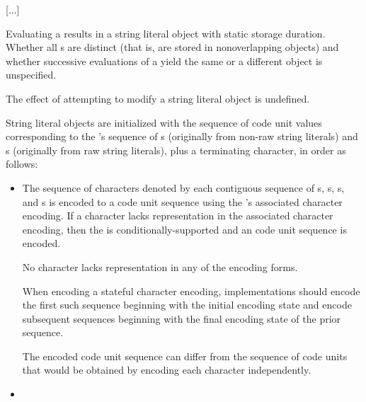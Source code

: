 \documentclass{wg21}
\newcommand{\replaceucs}{\changed{UCS}{Unicode}}
\begin{document}
\textcolor{noteclr}{[...]}


\pnum
Evaluating a  results in a string literal object
with static storage duration.
%
Whether all s are distinct (that is, are stored in
nonoverlapping objects) and whether successive evaluations of a
 yield the same or a different object is
unspecified.
\begin{note}
    The effect of attempting to modify a string literal object is undefined.
\end{note}

\pnum
{}%
%
%
String literal objects are initialized with
the sequence of code unit values
corresponding to the 's sequence of
s (originally from non-raw string literals) and
s (originally from raw string literals),
plus a terminating  character,
in order as follows:
\begin{itemize}
    \item
    The sequence of characters denoted by each contiguous sequence of
    s,
    s,
    s, and
    s
    is encoded to a code unit sequence
    using the 's associated character encoding.
    If a character lacks representation in the associated character encoding,
    then the  is conditionally-supported and
    an
    code unit sequence is encoded.
    \begin{note}
        No character lacks representation in any of the \replaceucs{} encoding forms.
    \end{note}
    When encoding a stateful character encoding,
    implementations should encode the first such sequence
    beginning with the initial encoding state and
    encode subsequent sequences
    beginning with the final encoding state of the prior sequence.
    \begin{note}
        The encoded code unit sequence can differ from
        the sequence of code units that would be obtained by
        encoding each character independently.
    \end{note}
    \item
\end{itemize}
\end{document}
